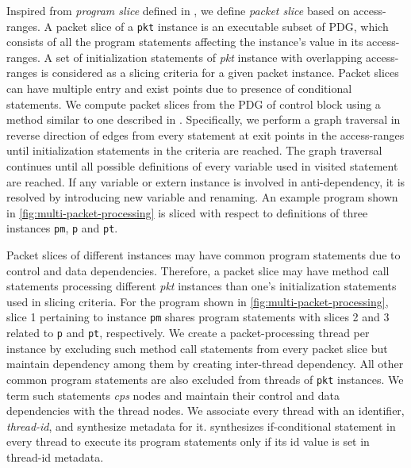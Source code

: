 \documentclass[letterpaper,twocolumn,10pt]{article}
\begin{document}
Inspired from \emph{program slice} defined in 
\cite{Weiser:1981:PS:800078.802557}, we define \emph{packet slice} 
based on access-ranges. A packet slice of a \texttt{pkt} instance is 
an executable subset of PDG, which consists of all the program 
statements affecting the instance's value in its access-ranges.
A set of initialization statements of \emph{pkt} instance with 
overlapping access-ranges is considered as a slicing criteria for a 
given packet instance. Packet slices can have multiple entry and 
exist points due to presence of conditional statements.
We compute packet slices from the PDG of control block using a method 
similar to one described in \cite{Ferrante:1987:PDG:24039.24041}.
Specifically, we perform a graph traversal in reverse direction of 
edges from every statement at exit points in the access-ranges until 
initialization statements in the criteria are reached.
The graph traversal continues until all possible definitions of every 
variable used in visited statement are reached.
If any variable or extern instance is involved in anti-dependency, it 
is resolved by introducing new variable and renaming.
An example program shown in \cref{fig:multi-packet-processing} 
is sliced with respect to definitions of three instances 
\texttt{pm}, \texttt{p} and \texttt{pt}.


Packet slices of different instances may have common program 
statements due to control and data dependencies. Therefore, a packet 
slice may have method call statements processing different \emph{pkt} 
instances than one's initialization statements used in slicing 
criteria. For the program shown in \cref{fig:multi-packet-processing}, 
slice 1 pertaining to instance \texttt{pm} shares program statements 
with slices 2 and 3 related to \texttt{p} and \texttt{pt}, 
respectively.
We create a packet-processing thread per instance by excluding such 
method call statements from every packet slice but maintain dependency 
among them by creating inter-thread dependency.
All other common program statements are also excluded from threads of 
\texttt{pkt} instances. We term such statements \emph{cps} nodes and 
maintain their control and data dependencies with the thread nodes.
We associate every thread with an identifier, \emph{thread-id}, and 
synthesize metadata for it. \ucomp synthesizes if-conditional 
statement in every thread to execute its program statements only if 
its id value is set in thread-id metadata.
\end{document}
